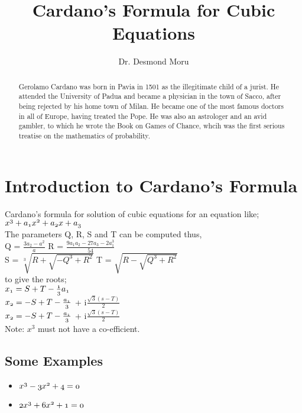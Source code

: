 \documentclass{article}
\begin{document}
	\title{Cardano's Formula for Cubic Equations}
	\author{Dr. Desmond Moru}
	\maketitle
	
	\begin{abstract}
		Gerolamo Cardano was born in Pavia in 1501 as the illegitimate child of a jurist. He attended the University of Padua and became a physician in the town of Sacco, after being rejected by his home town of Milan. He became one of the most famous doctors in all of Europe, having treated the Pope. He was also an astrologer and an avid gambler, to which he wrote the Book on Games of Chance, whcih was the first serious treatise on the mathematics of probability.\cite{cardano}
		\end{abstract}


\section{Introduction to Cardano's Formula}
Cardano's formula for solution of cubic equations for an equation like; \\
	$\mathnormal{x^{3} + a_{1}x^{2} +a_{2}x +a_{3}}$ \\
	The parameters Q, R, S and T can be computed  thus, \\

	Q = $\frac{3a_{2}-a^{2}}{a}$  R = $\frac{9a_{1}a_{2}-27a_{3}-2a^{3}_{1}}{54}$ 
	\\
	
	S = $\sqrt[3]{R + \sqrt{-Q^{3} + R^{2}}}$  T = $\sqrt{R - \sqrt{Q^{3} + R^{2}}} $ 
	\\
	
	to give the roots; 
	\\

	$\mathnormal{x_{1} = S + T - \frac{1}{3}a_{1}}$ 
	\\
	$\mathnormal{x_{2} = -S + T - \frac{a_{1}}{3}}$ + i$\frac{\sqrt{3}(s-T)}{2}$ 
	\\
	$\mathnormal{x_{2} = -S + T - \frac{a_{1}}{3}}$ + i$\frac{\sqrt{3}(s-T)}{2}$ 
	\\
	
	Note: $x^{3}$ must not have a co-efficient.
	
	\subsection{Some Examples}
	\begin{itemize}
		\item $\mathnormal{x^{3} - 3x^{2} + 4 = 0}$
		\item $\mathnormal{2x^{3} + 6x^{2} + 1 = 0}$
	\end{itemize}
	
	
\end{document}
